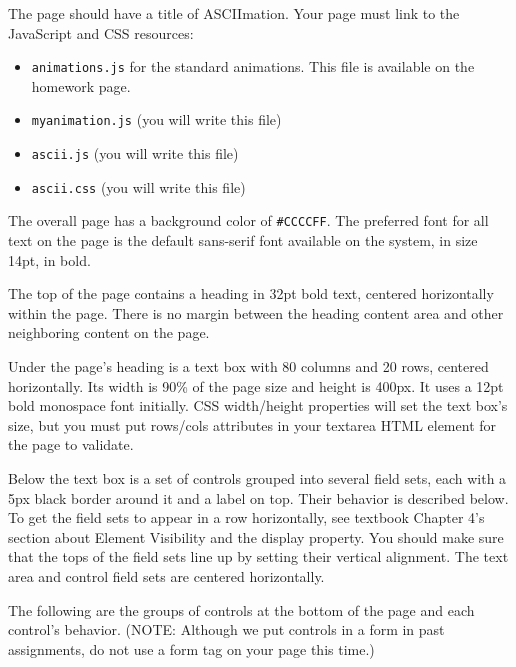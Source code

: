 \documentclass{article}
\newcommand{\myitem}[1]{\noindent\hspace{-.25in}{\large\bf #1}}
\begin{document}
\myitem{Appearance Details:} The page should have a title of
ASCIImation.  Your page must link to the JavaScript and CSS resources:
\begin{itemize}
  \item
 {\tt animations.js} for the standard animations.  This file is
 available on the homework page.
\item
  {\tt myanimation.js} (you will write this file)
\item {\tt ascii.js} (you will write
  this file)
\item {\tt ascii.css} (you will write this file)
\end{itemize}

 The overall page has a background color of
{\tt \#CCCCFF}. The preferred font for all text on the page is the default
sans-serif font available on the system, in size 14pt, in bold.

The
top of the page contains a heading in 32pt bold text, centered
horizontally within the page. There is no margin between the heading
content area and other neighboring content on the page.

Under the
page's heading is a text box with 80 columns and 20 rows, centered
horizontally.  Its width is 90\% of the page size and height is 400px.
It uses a 12pt bold monospace font initially.  CSS width/height
properties will set the text box's size, but you must put rows/cols
attributes in your textarea HTML element for the page to validate.

Below the text box is a set of controls grouped into several field
sets, each with a 5px black border around it and a label on top.
Their behavior is described below.  To get the field sets to appear in
a row horizontally, see textbook Chapter 4's section about Element
Visibility and the display property.  You should make sure that the
tops of the field sets line up by setting their vertical alignment.
The text area and control field sets are centered horizontally.


\myitem{Behavior Details:} The following are the groups of controls at
the bottom of the page and each control's behavior.  (NOTE: Although
we put controls in a form in past assignments, do not use a form tag
on your page this time.)
\end{document}

